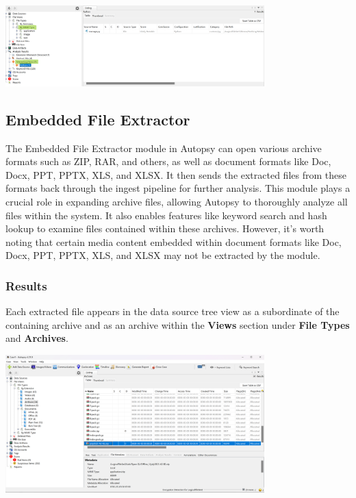\documentclass{extarticle}
\begin{document}
\begin{center}
    \includegraphics[width=0.75\textwidth]{3/3.3/Custom File Type Identification Settings.png}
\end{center}

\subsection{Embedded File Extractor}
The Embedded File Extractor module in Autopsy can open various archive formats such as ZIP, RAR, and others, as well as document formats like Doc, Docx, PPT, PPTX, XLS, and XLSX. It then sends the extracted files from these formats back through the ingest pipeline for further analysis. This module plays a crucial role in expanding archive files, allowing Autopsy to thoroughly analyze all files within the system. It also enables features like keyword search and hash lookup to examine files contained within these archives. However, it's worth noting that certain media content embedded within document formats like Doc, Docx, PPT, PPTX, XLS, and XLSX may not be extracted by the module.

\subsubsection*{Results}
Each extracted file appears in the data source tree view as a subordinate of the containing archive and as an archive within the \textbf{Views} section under \textbf{File Types } and \textbf{Archives}.

\begin{center}
    \includegraphics[width=0.75\textwidth]{3/3.4/Embedded File Extractor Results.png}
\end{center}
\end{document}

